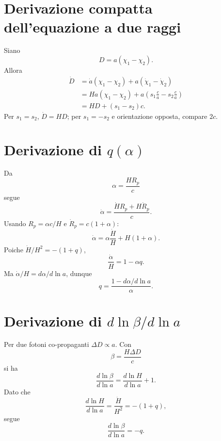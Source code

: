 \documentclass[11pt,a4paper]{article}
\begin{document}
\appendix
\section{Derivazione compatta dell'equazione a due raggi}

Siano
\begin{equation}
D=a(\chi_1-\chi_2).
\end{equation}
Allora
\begin{align}
\dot D&=\dot a(\chi_1-\chi_2)+a(\dot\chi_1-\dot\chi_2)\\
&=H a(\chi_1-\chi_2)+a\left(s_1\frac ca-s_2\frac ca\right)\\
&=HD+(s_1-s_2)c.
\end{align}
Per $s_1=s_2$, $\dot D=HD$; per $s_1=-s_2$ e orientazione opposta, compare $2c$.

\section{Derivazione di $q(\alpha)$}

Da
\begin{equation}
\alpha=\frac{HR_p}{c}
\end{equation}
segue
\begin{equation}
\dot\alpha=\frac{\dot H R_p+H\dot R_p}{c}.
\end{equation}
Usando $R_p=\alpha c/H$ e $\dot R_p=c(1+\alpha)$:
\begin{equation}
\dot\alpha=\alpha\frac{\dot H}{H}+H(1+\alpha).
\end{equation}
Poiche $\dot H/H^2=-(1+q)$,
\begin{equation}
\frac{\dot\alpha}{H}=1-\alpha q.
\end{equation}
Ma $\dot\alpha/H=d\alpha/d\ln a$, dunque
\begin{equation}
q=\frac{1-d\alpha/d\ln a}{\alpha}.
\end{equation}

\section{Derivazione di $d\ln\beta/d\ln a$}

Per due fotoni co-propaganti $\Delta D\propto a$. Con
\begin{equation}
\beta=\frac{H\Delta D}{c}
\end{equation}
si ha
\begin{equation}
\frac{d\ln\beta}{d\ln a}=\frac{d\ln H}{d\ln a}+1.
\end{equation}
Dato che
\begin{equation}
\frac{d\ln H}{d\ln a}=\frac{\dot H}{H^2}=-(1+q),
\end{equation}
segue
\begin{equation}
\frac{d\ln\beta}{d\ln a}=-q.
\end{equation}
\end{document}
